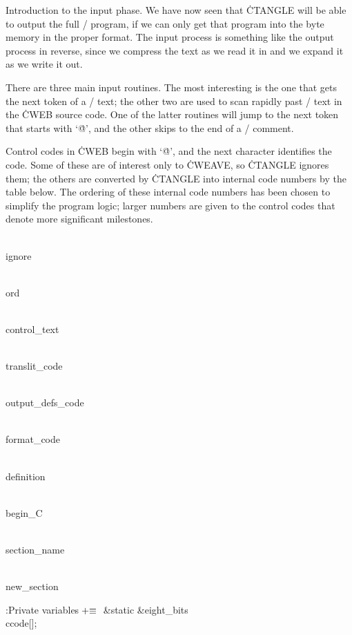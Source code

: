 Introduction to the input phase.
We have now seen that \.{CTANGLE} will be able to output the full
\CEE/ program, if we can only get that program into the byte memory in
the proper format. The input process is something like the output process
in reverse, since we compress the text as we read it in and we expand it
as we write it out.

There are three main input routines. The most interesting is the one that gets
the next token of a \CEE/ text; the other two are used to scan rapidly past
\TEX/ text in the \.{CWEB} source code. One of the latter routines will jump to
the next token that starts with `\.{@}', and the other skips to the end
of a \CEE/ comment.

\fi

Control codes in \.{CWEB} begin with `\.{@}', and the next character
identifies the code. Some of these are of interest only to \.{CWEAVE},
so \.{CTANGLE} ignores them; the others are converted by \.{CTANGLE} into
internal code numbers by the  table below. The ordering
of these internal code numbers has been chosen to simplify the program logic;
larger numbers are given to the control codes that denote more significant
milestones.

\Y\B\4\D\\{ignore}\5
\par
\B\4\D\\{ord}\5
\par
\B\4\D\\{control\_text}\5
\par
\B\4\D\\{translit\_code}\5
\par
\B\4\D\\{output\_defs\_code}\5
\par
\B\4\D\\{format\_code}\5
\par
\B\4\D\\{definition}\5
\par
\B\4\D\\{begin\_C}\5
\par
\B\4\D\\{section\_name}\5
\par
\B\4\D\\{new\_section}\5
\par
\Y\B\4:Private variables\X${}\mathrel+\equiv{}$\6
\&{static} \&{eight\_bits} \\{ccode}[];\par
\fi

